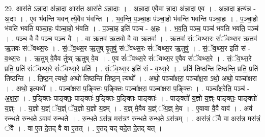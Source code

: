 \documentclass[17pt]{extarticle}
\begin{document}
29. आस॑ते ऽन्ना॒दा अ॑न्ना॒दा आस॑त॒ आस॑ते ऽन्ना॒दाः । . अ॒न्ना॒दा ए॒वैवा न्ना॒दा अ॑न्ना॒दा ए॒व । . अ॒न्ना॒दा इत्य॑न्न - अ॒दाः । . ए॒व भ॑वन्ति भवन् त्ये॒वैव भ॑वन्ति । . भ॒व॒न्ति॒ प॒ञ्चा॒हः प॑ञ्चा॒हो भ॑वन्ति भवन्ति पञ्चा॒हः । . प॒ञ्चा॒हो भ॑वति भवति पञ्चा॒हः प॑ञ्चा॒हो भ॑वति । . प॒ञ्चा॒ह इति॑ पञ्च - अ॒हः । . भ॒व॒ति॒ पञ्च॒ पञ्च॑ भवति भवति॒ पञ्च॑ । . पञ्च॒ वै वै पञ्च॒ पञ्च॒ वै । . वा ऋ॒तव॑ ऋ॒तवो॒ वै वा ऋ॒तवः॑ । . ऋ॒तवः॑ संॅवथ्स॒रः सं॑ॅवथ्स॒र ऋ॒तव॑ ऋ॒तवः॑ संॅवथ्स॒रः । . सं॒ॅव॒थ्स॒र ऋ॒तुष् वृ॒तुषु॑ संॅवथ्स॒रः सं॑ॅवथ्स॒र ऋ॒तुषु॑ । . सं॒ॅव॒थ्स॒र इति॑ सं - व॒थ्स॒रः । . ऋ॒तुष् वे॒वैव र्तुष्व् ऋ॒तुष् वे॒व । . ए॒व सं॑ॅवथ्स॒रे सं॑ॅवथ्स॒र ए॒वैव सं॑ॅवथ्स॒रे । . सं॒ॅव॒थ्स॒रे प्रति॒ प्रति॑ संॅवथ्स॒रे सं॑ॅवथ्स॒रे प्रति॑ । . सं॒ॅव॒थ्स॒र इति॑ सं - व॒थ्स॒रे । . प्रति॑ तिष्ठन्ति तिष्ठन्ति॒ प्रति॒ प्रति॑ तिष्ठन्ति । . ति॒ष्ठ॒न् त्यथो॒ अथो॑ तिष्ठन्ति तिष्ठ॒न् त्यथो᳚ । . अथो॒ पञ्चा᳚क्षरा॒ पञ्चा᳚क्ष॒रा ऽथो॒ अथो॒ पञ्चा᳚क्षरा । . अथो॒ इत्यथो᳚ । . पञ्चा᳚क्षरा प॒ङ्क्तिः प॒ङ्क्तिः पञ्चा᳚क्षरा॒ पञ्चा᳚क्षरा प॒ङ्क्तिः । . पञ्चा᳚क्ष॒रेति॒ पञ्च॑ - अ॒क्ष॒रा॒ । . प॒ङ्क्तिः पाङ्क्तः॒ पाङ्क्तः॑ प॒ङ्क्तिः प॒ङ्क्तिः पाङ्क्तः॑ । . पाङ्क्तो॑ य॒ज्ञो य॒ज्ञ्ः पाङ्क्तः॒ पाङ्क्तो॑ य॒ज्ञ्ः । . य॒ज्ञो य॒ज्ञ्ं ॅय॒ज्ञ्ं ॅय॒ज्ञो य॒ज्ञो य॒ज्ञ्म् । . य॒ज्ञ् मे॒वैव य॒ज्ञ्ं ॅय॒ज्ञ् मे॒व । . ए॒वावा वै॒वै वाव॑ । . अव॑ रुन्धते रुन्ध॒ते ऽवाव॑ रुन्धते । . रु॒न्ध॒ते ऽस॑त्र॒ मस॑त्रꣳ रुन्धते रुन्ध॒ते ऽस॑त्रम् । . अस॑त्रं॒ ॅवै वा अस॑त्र॒ मस॑त्रं॒ ॅवै । . वा ए॒त दे॒तद् वै वा ए॒तत् । . ए॒तद् यद् यदे॒त दे॒तद् यत् । \newline
\end{document}
